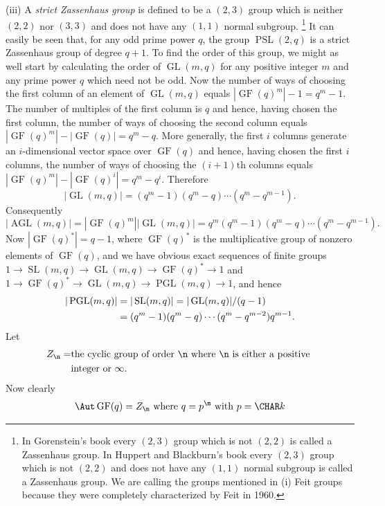 (iii) A {\it strict Zassenhaus group} is defined to be a 
$(2,3)$ group 
which is neither $(2,2)$  nor $(3,3)$ and does not have 
any $(1,1)$ normal 
subgroup.  
\footnote{In Gorenstein's book \cite{G1} every $(2,3)$ 
group which
is not $(2,2)$ is called a Zassenhaus group.  In Huppert 
and Blackburn's book
\cite{HB} every $(2,3)$ group which is not $(2,2)$ and 
does not have
any $(1,1)$ normal subgroup is called a Zassenhaus group.  
We are calling
the groups mentioned in (i) Feit groups because they were 
completely
characterized by Feit \cite{F} in 1960.}
It can easily be seen that, for any odd prime power $q$, 
the group
$\operatorname{PSL}(2,q)$ is a strict Zassenhaus group of 
degree $q+1$.
To find the order of this group, we might as well start by 
calculating the 
order of $\operatorname{GL}(m,q)$ for any positive integer 
$m$ and any prime power $q$
which need not be odd. Now the number of ways of choosing 
the first column
of an element of $\operatorname{GL}(m,q)$ equals 
$|\operatorname{GF}(q)^m|-1=q^m-1$. The number of multiples 
of the first column is $q$ and hence, having chosen the 
first column, the 
number of ways of choosing the second column equals
$|\operatorname{GF}(q)^m|-|\operatorname{GF}(q)|=q^m-q$. 
More generally, the first $i$ columns generate an 
$i$-dimensional vector space over $\operatorname{GF}(q)$ 
and hence, having chosen
the first $i$ columns, the number of ways of choosing the 
$(i+1)\text{th}$
columns equals $|\operatorname{GF}(q)^m|-|%
\operatorname{GF}(q)^i|=q^m-q^i$. Therefore
$$
|\operatorname{GL}(m,q)|=(q^m-1)(q^m-q)\dotsb(q^m-q^{m-1}).
$$
Consequently
$$
|\operatorname{AGL}(m,q)|=|\operatorname{GF}(q)^m||
\operatorname{GL}(m,q)|=q^m(q^m-1)(q^m-q)%
\dotsb(q^m-q^{m-1}).
$$
Now $|\operatorname{GF}(q)^*|=q-1$, where 
$\operatorname{GF}(q)^*$ is the multiplicative group of
nonzero elements of $\operatorname{GF}(q)$, and we have 
obvious exact sequences of finite
groups $1\to \operatorname{SL}(m,q)\to 
\operatorname{GL}(m,q)\to \operatorname{GF}(q)^*\to 1$ and
$1\to \operatorname{GF}(q)^*\to \operatorname{GL}(m,q)\to 
\operatorname{PGL}(m,q)\to 1$, and hence
$$
\split
|\operatorname{PGL}(m,q)|&=|\operatorname{SL}(m,q)|=|%
\operatorname{GL}
 (m,q)|/(q-1)\\
&=(q^m-1)(q^m-q)\dotsb(q^m-q^{m-2})q^{m-1}.
\endsplit
$$
Let
$$
\split
Z_{\n}=&\text{the cyclic group of order }\n\text{ where }\n 
\text{ is either a positive }\\
&\text{integer or }\infty.
\endsplit
$$
Now clearly 
$$
\Aut \operatorname{GF}(q)=Z_{\m}\text{ where 
}q=p^{\m}\text{ with }p= \CHAR k
$$
